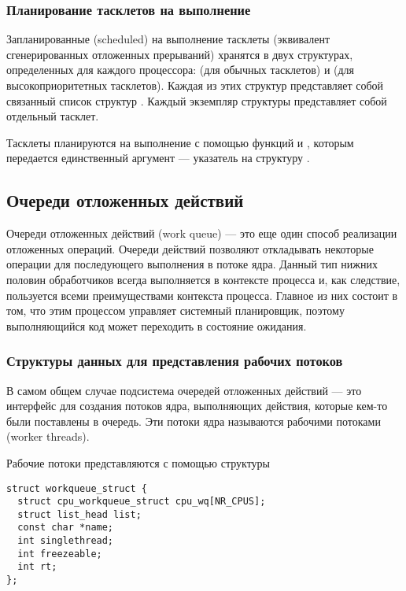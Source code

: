 \subsubsection{Планирование тасклетов на выполнение}

Запланированные (scheduled) на выполнение тасклеты (эквивалент сгенерированных отложенных прерываний) хранятся в двух структурах, определенных для каждого процессора:  (для обычных тасклетов) и  (для высокоприоритетных тасклетов). Каждая из этих структур представляет собой связанный список структур . Каждый экземпляр структуры  представляет собой отдельный тасклет.

Тасклеты планируются на выполнение с помощью функций  и , которым передается единственный аргумент — указатель на структуру .

\subsection{Очереди отложенных действий}

Очереди отложенных действий (work queue) — это еще один способ реализации отложенных операций. Очереди действий позволяют откладывать некоторые операции для последующего выполнения в потоке ядра. Данный тип нижних половин обработчиков всегда выполняется в контексте процесса и, как следствие, пользуется всеми преимуществами контекста процесса. Главное из них состоит в том, что этим процессом управляет системный планировщик, поэтому выполняющийся код может переходить в состояние ожидания.

\subsubsection{Структуры данных для представления рабочих потоков}
В самом общем случае подсистема очередей отложенных действий — это интерфейс для создания потоков ядра, выполняющих действия, которые кем-то были поставлены в очередь. Эти потоки ядра называются рабочими потоками (worker threads).

Рабочие потоки представляются с помощью структуры 

\begin{lstlisting}
struct workqueue_struct {
  struct cpu_workqueue_struct cpu_wq[NR_CPUS];
  struct list_head list;
  const char *name;
  int singlethread;
  int freezeable;
  int rt;
};
\end{lstlisting}

